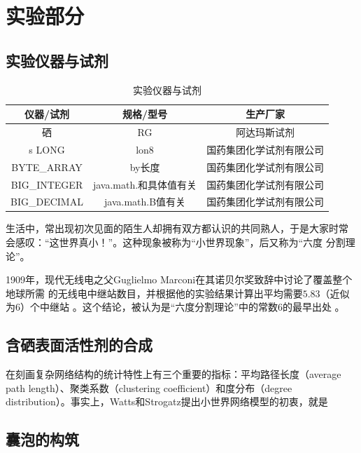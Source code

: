\documentclass[bachelor,winfonts]{jnuthesis} %
\begin{document}
    \chapter{实验部分}\label{chapter_experiment}
    \section{实验仪器与试剂}
        \begin{table}[htp]
        \centering
        \begin{tabular}{ccc}
            \toprule
            \textbf{仪器/试剂} & \textbf{规格/型号} & \textbf{生产厂家} \\
            \midrule
            硒   &  RG  & 阿达玛斯试剂 \\
s            LONG     & lon8  & 国药集团化学试剂有限公司 \\
            BYTE\_ARRAY & by长度 & 国药集团化学试剂有限公司 \\
            BIG\_INTEGER & java.math.和具体值有关 & 国药集团化学试剂有限公司 \\
            BIG\_DECIMAL & java.math.B值有关 & 国药集团化学试剂有限公司 \\
            \bottomrule
        \end{tabular}
        \caption{实验仪器与试剂}\label{table:实验仪器与试剂}
    \end{table}
    生活中，常出现初次见面的陌生人却拥有双方都认识的共同熟人，于是大家时常
    会感叹：“这世界真小！”。这种现象被称为``小世界现象''，后又称为``六度
    分割理论''。
    
    1909年，现代无线电之父Guglielmo Marconi在其诺贝尔奖致辞中讨论了覆盖整个地球所需
    的无线电中继站数目，并根据他的实验结果计算出平均需要$5.83$（近似为$6$）个中继站
    \cite{marconi1909nobel}。这个结论，被认为是``六度分割理论''中的常数$6$的最早出处
    \cite{barabasi2003linked}。
    
    \section{含硒表面活性剂的合成}
    
    在刻画复杂网络结构的统计特性上有三个重要的指标：平均路径长度（average
    path length）、聚类系数（clustering coefficient）和度分布（degree
    distribution）。事实上，Watts和Strogatz提出小世界网络模型的初衷，就是
    
    \section{囊泡的构筑}
    
\end{document}
